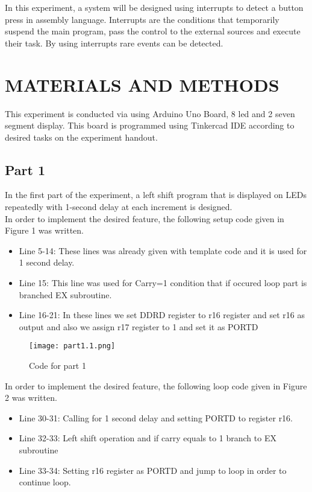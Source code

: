 \documentclass[pdftex,12pt,a4paper]{article}
\begin{document}
In this experiment, a system will be designed using interrupts to detect a button press in assembly language. Interrupts are the conditions that temporarily suspend the main program, pass the control to the external sources and execute their task. By using interrupts rare events can be detected.\\
\section{MATERIALS AND METHODS}

This experiment is conducted via using Arduino Uno Board, 8 led and 2 seven segment display. This board is programmed using Tinkercad IDE according to desired tasks on the experiment handout.\\

\subsection{Part 1}
In the first part of the experiment, a left shift program that is displayed on LEDs repeatedly with 1-second delay at each increment is designed.\\
In order to implement the desired feature, the following setup code given in Figure 1 was written.

\begin{itemize}
    \item Line 5-14: These lines was already given with template code and it is used for 1 second delay.
    \item Line 15: This line was used for Carry=1 condition that if occured loop part is branched EX subroutine.
    \item Line 16-21: In these lines we set DDRD register to r16 register and set r16 as output and also we assign r17 register to 1 and set it as PORTD
\end{itemize}

\begin{figure}[ht]
	\centering
	\texttt{[image: part1.1.png]}	
	\caption{Code for part 1}
	\label{fig1}
\end{figure}

In order to implement the desired feature, the following loop code given in Figure 2 was written.\\

\begin{itemize}
    \item Line 30-31: Calling for 1 second delay and setting PORTD to register r16.
    \item Line 32-33: Left shift operation and if carry equals to 1 branch to EX subroutine
    \item Line 33-34: Setting r16 register as PORTD and jump to loop in order to continue loop.
\end{itemize}
\end{document}
